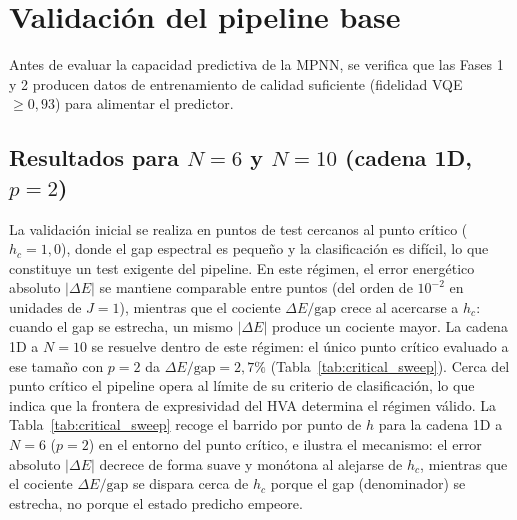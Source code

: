 \documentclass[11pt,a4paper,spanish]{book}
\begin{document}
\section{Validación del pipeline base}

Antes de evaluar la capacidad predictiva de la MPNN, se verifica que las Fases 1 y 2 producen datos de entrenamiento de calidad suficiente (fidelidad VQE $\geq 0,93$) para alimentar el predictor.

\subsection{Resultados para $N = 6$ y $N = 10$ (cadena 1D, $p = 2$)}

La validación inicial se realiza en puntos de test cercanos al punto crítico ($h_c = 1,0$), donde el gap espectral es pequeño y la clasificación es difícil, lo que constituye un test exigente del pipeline. En este régimen, el error energético absoluto $|\Delta E|$ se mantiene comparable entre puntos (del orden de $10^{-2}$ en unidades de $J = 1$), mientras que el cociente $\Delta E/\text{gap}$ crece al acercarse a $h_c$: cuando el gap se estrecha, un mismo $|\Delta E|$ produce un cociente mayor. La cadena 1D a $N = 10$ se resuelve dentro de este régimen: el único punto crítico evaluado a ese tamaño con $p = 2$ da $\Delta E/\text{gap} = 2{,}7\%$ (Tabla~\ref{tab:critical_sweep}). Cerca del punto crítico el pipeline opera al límite de su criterio de clasificación, lo que indica que la frontera de expresividad del HVA determina el régimen válido.
La Tabla~\ref{tab:critical_sweep} recoge el barrido por punto de $h$ para la cadena 1D a $N = 6$ ($p = 2$) en el entorno del punto crítico, e ilustra el mecanismo: el error absoluto $|\Delta E|$ decrece de forma suave y monótona al alejarse de $h_c$, mientras que el cociente $\Delta E/\text{gap}$ se dispara cerca de $h_c$ porque el gap (denominador) se estrecha, no porque el estado predicho empeore.
\end{document}

